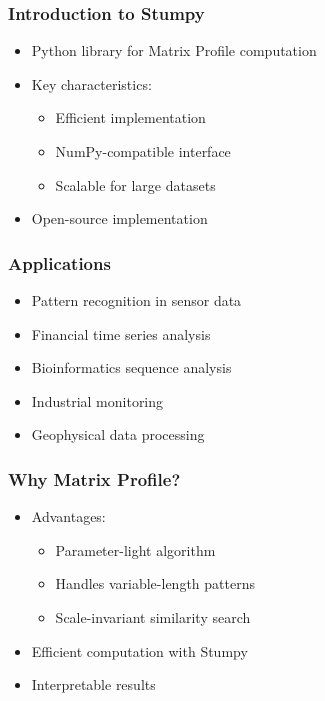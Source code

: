 \begin{frame}[fragile]\frametitle{Introduction to Stumpy}
    \begin{itemize}
        \item Python library for Matrix Profile computation
        \item Key characteristics:
            \begin{itemize}
                \item Efficient implementation
                \item NumPy-compatible interface
                \item Scalable for large datasets
            \end{itemize}
        \item Open-source implementation
    \end{itemize}
\end{frame}

\begin{frame}[fragile]\frametitle{Applications}
    \begin{itemize}
        \item Pattern recognition in sensor data
        \item Financial time series analysis
        \item Bioinformatics sequence analysis
        \item Industrial monitoring
        \item Geophysical data processing
    \end{itemize}
\end{frame}

\begin{frame}[fragile]\frametitle{Why Matrix Profile?}
    \begin{itemize}
        \item Advantages:
            \begin{itemize}
                \item Parameter-light algorithm
                \item Handles variable-length patterns
                \item Scale-invariant similarity search
            \end{itemize}
        \item Efficient computation with Stumpy
        \item Interpretable results
    \end{itemize}
\end{frame}
